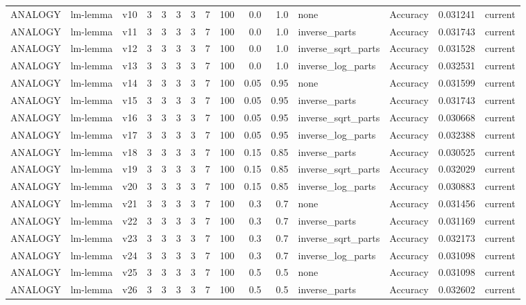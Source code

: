 \documentclass{article}
\begin{document}
\begin{xltabular}{\linewidth}{@{}lYcrrrrrrrrYlrl@{}}
ANALOGY & lm-lemma & v10 & 3 & 3 & 3 & 3 & 7 & 100 & 0.0 & 1.0 & none & Accuracy & 0.031241 & current \\
ANALOGY & lm-lemma & v11 & 3 & 3 & 3 & 3 & 7 & 100 & 0.0 & 1.0 & inverse\_parts & Accuracy & 0.031743 & current \\
ANALOGY & lm-lemma & v12 & 3 & 3 & 3 & 3 & 7 & 100 & 0.0 & 1.0 & inverse\_sqrt\_parts & Accuracy & 0.031528 & current \\
ANALOGY & lm-lemma & v13 & 3 & 3 & 3 & 3 & 7 & 100 & 0.0 & 1.0 & inverse\_log\_parts & Accuracy & 0.032531 & current \\
ANALOGY & lm-lemma & v14 & 3 & 3 & 3 & 3 & 7 & 100 & 0.05 & 0.95 & none & Accuracy & 0.031599 & current \\
ANALOGY & lm-lemma & v15 & 3 & 3 & 3 & 3 & 7 & 100 & 0.05 & 0.95 & inverse\_parts & Accuracy & 0.031743 & current \\
ANALOGY & lm-lemma & v16 & 3 & 3 & 3 & 3 & 7 & 100 & 0.05 & 0.95 & inverse\_sqrt\_parts & Accuracy & 0.030668 & current \\
ANALOGY & lm-lemma & v17 & 3 & 3 & 3 & 3 & 7 & 100 & 0.05 & 0.95 & inverse\_log\_parts & Accuracy & 0.032388 & current \\
ANALOGY & lm-lemma & v18 & 3 & 3 & 3 & 3 & 7 & 100 & 0.15 & 0.85 & inverse\_parts & Accuracy & 0.030525 & current \\
ANALOGY & lm-lemma & v19 & 3 & 3 & 3 & 3 & 7 & 100 & 0.15 & 0.85 & inverse\_sqrt\_parts & Accuracy & 0.032029 & current \\
ANALOGY & lm-lemma & v20 & 3 & 3 & 3 & 3 & 7 & 100 & 0.15 & 0.85 & inverse\_log\_parts & Accuracy & 0.030883 & current \\
ANALOGY & lm-lemma & v21 & 3 & 3 & 3 & 3 & 7 & 100 & 0.3 & 0.7 & none & Accuracy & 0.031456 & current \\
ANALOGY & lm-lemma & v22 & 3 & 3 & 3 & 3 & 7 & 100 & 0.3 & 0.7 & inverse\_parts & Accuracy & 0.031169 & current \\
ANALOGY & lm-lemma & v23 & 3 & 3 & 3 & 3 & 7 & 100 & 0.3 & 0.7 & inverse\_sqrt\_parts & Accuracy & 0.032173 & current \\
ANALOGY & lm-lemma & v24 & 3 & 3 & 3 & 3 & 7 & 100 & 0.3 & 0.7 & inverse\_log\_parts & Accuracy & 0.031098 & current \\
ANALOGY & lm-lemma & v25 & 3 & 3 & 3 & 3 & 7 & 100 & 0.5 & 0.5 & none & Accuracy & 0.031098 & current \\
ANALOGY & lm-lemma & v26 & 3 & 3 & 3 & 3 & 7 & 100 & 0.5 & 0.5 & inverse\_parts & Accuracy & 0.032602 & current \\

\end{xltabular}
\end{document}
